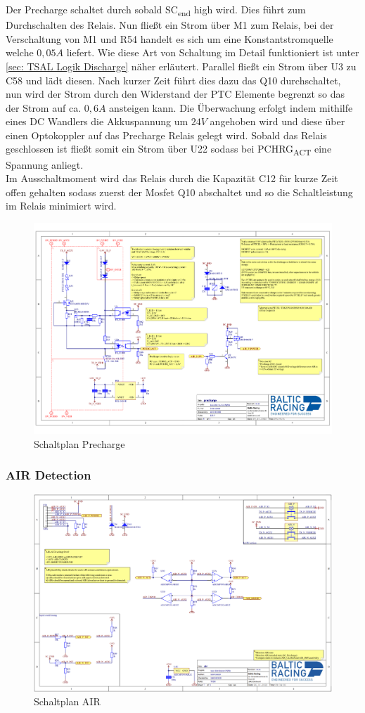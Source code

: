 Der Precharge schaltet durch sobald SC\textsubscript{end} high wird. Dies führt zum Durchschalten des Relais. Nun fließt ein Strom über M1 zum Relais, bei der Verschaltung von M1 und R54 handelt es sich um eine Konstantstromquelle welche \ensuremath{0,05A} liefert. Wie diese Art von Schaltung im Detail funktioniert ist unter \ref{sec: TSAL Logik Discharge} näher erläutert. Parallel fließt ein Strom über U3 zu C58 und lädt diesen. Nach kurzer Zeit führt dies dazu das Q10 durchschaltet, nun wird der Strom durch den Widerstand der PTC Elemente begrenzt so das der Strom auf ca. \ensuremath{0,6 A} ansteigen kann. Die Überwachung erfolgt indem mithilfe eines DC Wandlers die Akkuspannung um \ensuremath{24 V} angehoben wird und diese über einen Optokoppler auf das Precharge Relais gelegt wird. Sobald das Relais geschlossen ist fließt somit ein Strom über U22 sodass bei PCHRG\textsubscript{ACT} eine Spannung anliegt.
\\
Im Ausschaltmoment wird das Relais durch die Kapazität C12 für kurze Zeit offen gehalten sodass zuerst der Mosfet Q10 abschaltet und so die Schaltleistung im Relais minimiert wird.

\begin{figure}
	\centering
	\includegraphics[width=0.7\linewidth]{bilder/Precharge_Complete}
	\caption{Schaltplan Precharge}
	\label{fig:prechargecomplete}
\end{figure}
\FloatBarrier

\subsubsection{\ac{AIR} Detection}

\begin{figure}
	\centering
	\includegraphics[width=0.7\linewidth]{bilder/AIR_conditioning}
	\caption{Schaltplan AIR}
	\label{fig:airconditioning}
\end{figure}

